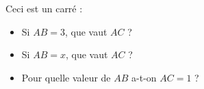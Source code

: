 \begin{MentalActivity}
\begin{mental}
        Ceci est un carré :

        \begin{center}
   
        \end{center}

        \begin{itemize}
            \item Si \( AB=3\), que vaut \( AC\) ?
            \item Si \( AB=x\), que vaut \( AC\) ?
            \item Pour quelle valeur de \( AB\) a-t-on \( AC=1\) ?
        \end{itemize}
\end{mental}
\end{MentalActivity}


